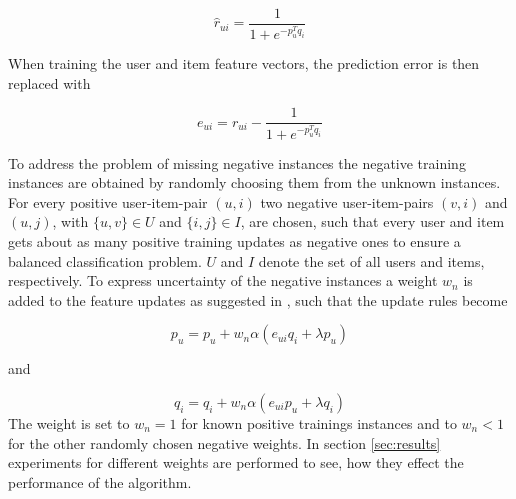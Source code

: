 \documentclass[10pt]{reportMaster}
\begin{document}
\begin{equation}
	\hat{r}_{ui} = \frac{1}{1 + e^{-p_u^Tq_i}}
\end{equation}

When training the user and item feature vectors, the prediction error is then replaced with 

\begin{equation}
	e_{ui} = r_{ui} - \frac{1}{1 + e^{-p_u^Tq_i}}
\end{equation}


To address the problem of missing negative instances the negative training instances are obtained by randomly choosing them from the unknown instances.
For every positive user-item-pair $(u, i)$ two negative user-item-pairs $(v, i)$ and $(u,j)$, with $\{u, v\} \in U$ and $\{i, j\} \in I$, are chosen, such that every user and item gets about as many positive training updates as negative ones to ensure a balanced classification problem.
$U$ and $I$ denote the set of all users and items, respectively.
To express uncertainty of the negative instances a weight $w_n$ is added to the feature updates as suggested in \cite{occf}, such that the update rules become 

\begin{equation}
	p_u = p_u + w_n \alpha (e_{ui} q_i + \lambda p_u)
\end{equation}

and 

\begin{equation}
	q_i = q_i + w_n \alpha (e_{ui} p_u + \lambda q_i)
\end{equation}
The weight is set to $w_n = 1$ for known positive trainings instances and to $w_n < 1$ for the other randomly chosen negative weights.
In section \ref{sec:results} experiments for different weights are performed to see, how they effect the performance of the algorithm.
\end{document}
